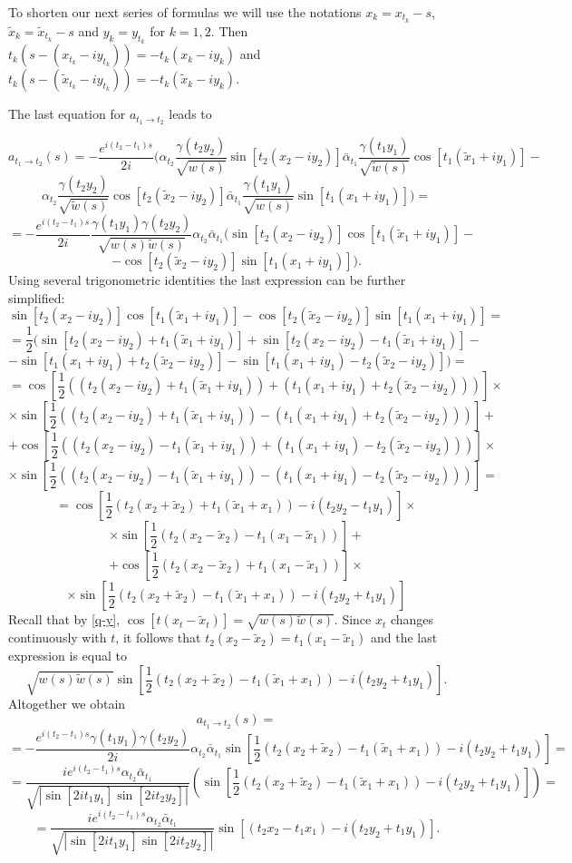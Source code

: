 \documentclass[11pt,twoside,reqno]{amsart}
\def\ti{\tilde}
\def\to{\rightarrow}
\def\g{\gamma}
\def\a{\alpha}
\theoremstyle{plain}
\numberwithin{equation}{section}
\begin{document}
To shorten our next series of formulas we will use the notations
 $x_k=x_{t_k}-s$, $\ti x_k=\ti x_{t_k}-s$ and $y_k=y_{t_k}$ for $k=1,2$.
 Then $t_k(s-(x_{t_k}-iy_{t_k}))=-t_k(x_k-iy_k)$ and $t_k(s-(\ti x_{t_k}-iy_{t_k}))=-t_k(\ti x_k-iy_k)$. 

The last equation for $a_{t_1 \to t_2}$ leads to

$$a_{t_1 \to t_2}(s)=-\frac {e^{i(t_2-t_1)s}}{2i}( \a_{t_2}\frac{\g(t_2 y_2)}{\sqrt{w(s)}}\sin [t_2(x_2-iy_2)]\bar\a_{t_1}\frac{\g(t_1 y_1)}{\sqrt{\ti w(s)}}\cos [t_1(\ti x_1+iy_1)]- $$$$
\a_{t_2}\frac{\g(t_2 y_2)}{\sqrt{\ti w(s)}}\cos [t_2(\ti x_2-iy_2)] \bar \a_{t_1}\frac{\g(t_1 y_1)}{\sqrt{ w(s)}}\sin [t_1(x_1+iy_1)]    )=
$$$$
=-\frac {e^{i(t_2-t_1)s}}{2i}\frac{\g(t_1 y_1)\g(t_2 y_2)}{\sqrt{w(s)\ti w(s)}}\a_{t_2}\bar\a_{t_1} (\sin [t_2(x_2-iy_2)]\cos [t_1(\ti x_1+iy_1)]-$$$$-\cos [t_2(\ti x_2-iy_2)]\sin [t_1(x_1+iy_1)]   ).
$$
Using several trigonometric identities 
the last expression can be further simplified:
$$
\sin [t_2(x_2-iy_2)]\cos [t_1(\ti x_1+iy_1)]-\cos [t_2(\ti x_2-iy_2)]\sin [t_1(x_1+iy_1)] =
$$$$
=\frac 12(\sin [t_2(x_2-iy_2)+t_1(\ti x_1+iy_1)] +\sin [t_2(x_2-iy_2)-t_1(\ti x_1+iy_1)]-
$$$$
-\sin [t_1(x_1+iy_1)+t_2(\ti x_2-iy_2)]  - \sin [t_1(x_1+iy_1)-t_2(\ti x_2-iy_2)])=
$$$$
=\cos\left[\frac 12 ((t_2(x_2-iy_2)+t_1(\ti x_1+iy_1))+(t_1(x_1+iy_1)+t_2(\ti x_2-iy_2)))\right]\times
$$$$\times\sin\left[\frac 12((t_2(x_2-iy_2)+t_1(\ti x_1+iy_1))-(t_1(x_1+iy_1)+t_2(\ti x_2-iy_2)))\right]+
$$$$
+\cos\left[\frac 12 ((t_2(x_2-iy_2)-t_1(\ti x_1+iy_1)) + (t_1(x_1+iy_1)-t_2(\ti x_2-iy_2)))\right] \times
$$$$\times\sin \left[\frac 12((t_2(x_2-iy_2)-t_1(\ti x_1+iy_1)) - (t_1(x_1+iy_1)-t_2(\ti x_2-iy_2)))\right]=
$$
$$
=\cos\left[\frac 12 (t_2(x_2+\ti x_2)+ t_1(\ti x_1+x_1) ) - i(t_2y_2-t_1y_1)\right]\times
$$$$\times\sin\left[\frac 12(t_2(x_2-\ti x_2) -t_1(x_1 -\ti x_1))\right]+
$$
$$
+\cos\left[\frac 12 (t_2(x_2-\ti x_2) + t_1(x_1-\ti x_1) )\right] \times
$$$$\times\sin \left[\frac 12(t_2(x_2+\ti x_2)-t_1(\ti x_1+x_1)) - i  (t_2y_2+t_1y_1)\right]
$$
 Recall that by \eqref{q-y}, $\cos [t(x_t-\ti x_t)]=\sqrt{w(s)\ti w(s)}$.
 Since $x_t$ changes continuously with $t$, it follows that $t_2(x_2-\ti x_2) =t_1(x_1 -\ti x_1)$ and the last expression is equal to
$$ \sqrt{w(s)\ti w(s)}\sin \left[\frac 12(t_2(x_2+\ti x_2)-t_1(\ti x_1+x_1)) - i  (t_2y_2+t_1y_1)\right].
$$
Altogether we obtain
$$a_{t_1 \to t_2}(s)=$$$$=-\frac {e^{i(t_2-t_1)s}\g(t_1 y_1)\g(t_2 y_2)}{2i}\a_{t_2}\bar\a_{t_1}\sin \left[\frac 12(t_2(x_2+\ti x_2)-t_1(\ti x_1+x_1)) - i  (t_2y_2+t_1y_1)\right]=
$$$$=
\frac { ie^{i(t_2-t_1)s}\a_{t_2}\bar\a_{t_1}}{\sqrt{|\sin [2it_1y_1]\sin [2it_2y_2]|}}\left(\sin \left[\frac 12(t_2(x_2+\ti x_2)-t_1(\ti x_1+x_1)) - i  (t_2y_2+t_1y_1)\right]\right)=
$$$$
=\frac { ie^{i(t_2-t_1)s}\a_{t_2}\bar\a_{t_1}}{\sqrt{|\sin [2it_1y_1]\sin [2it_2y_2]|}}\sin [(t_2x_2-t_1x_1) - i  (t_2y_2+t_1y_1)].
$$
\end{document}
